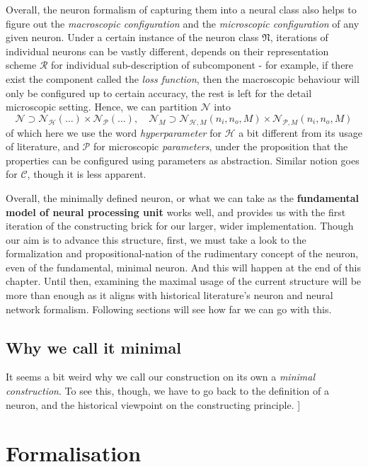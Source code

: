 Overall, the neuron formalism of capturing them into a neural class also helps to figure out the \textit{macroscopic configuration} and the \textit{microscopic configuration} of any given neuron. Under a certain instance of the neuron class $\mathfrak{N}$, iterations of individual neurons can be vastly different, depends on their representation scheme $\mathcal{R}$ for individual sub-description of subcomponent - for example, if there exist the component called the \textit{loss function}, then the macroscopic behaviour will only be configured up to certain accuracy, the rest is left for the detail microscopic setting. Hence, we can partition $\mathcal{N}$ into $$\mathcal{N}\supset \mathcal{N}_{\mathcal{H}}(\dots)\times \mathcal{N}_{\mathcal{P}}(\dots), \quad \mathcal{N}_{M}\supset \mathcal{N}_{\mathcal{H},M}(n_{i},n_{o},M)\times \mathcal{N}_{\mathcal{P},M}(n_{i},n_{o},M)$$
of which here we use the word \textit{hyperparameter} for $\mathcal{H}$ a bit different from its usage of literature, and $\mathcal{P}$ for microscopic \textit{parameters}, under the proposition that the properties can be configured using parameters as abstraction. Similar notion goes for $\mathcal{C}$, though it is less apparent. 

Overall, the minimally defined neuron, or what we can take as the \textbf{fundamental model of neural processing unit} works well, and provides us with the first iteration of the constructing brick for our larger, wider implementation. Though our aim is to advance this structure, first, we must take a look to the formalization and propositional-nation of the rudimentary concept of the neuron, even of the fundamental, minimal neuron. And this will happen at the end of this chapter. Until then, examining the maximal usage of the current structure will be more than enough as it aligns with historical literature's neuron and neural network formalism. Following sections will see how far we can go with this. 
\subsection{Why we call it minimal}

It seems a bit weird why we call our construction on its own a \textit{minimal construction}. To see this, though, we have to go back to the definition of a neuron, and the historical viewpoint on the constructing principle. ]

\section{Formalisation}

